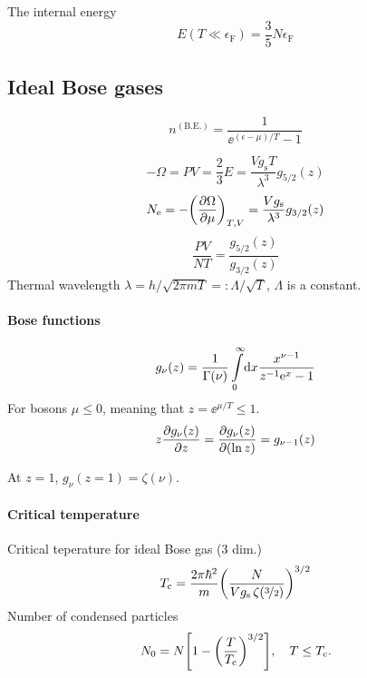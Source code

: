 \documentclass[11pt,letter, swedish, english, twocolumn
]{article}
\newcommand{\gs}{\ensuremath{{g_{\text{s}}}}}
\newcommand{\Ne}{\ensuremath{{N_{\text{e}}}}}
\newcommand{\Tc}{\ensuremath{{T_{\text{c}}}}}
\newcommand{\eF}{\ensuremath{{\epsilon_{\text{F}}}}}
\begin{document}
The internal energy
\begin{equation}
E(T\ll\eF)=\frac{3}{5}N\eF
\end{equation}


\subsection{Ideal Bose gases}
\begin{equation}
n^{(\text{B.E.})}=\frac{1}{\ee^{(\epsilon-\mu)/T}-1}
\end{equation}

\begin{equation}
-\Omega=PV=\frac{2}{3}E=\frac{V\gs T}{\lambda^3}g_{5/2}(z)
\end{equation}
\begin{equation}
\Ne=-\qty(\pdv{\Omega}{\mu})_{T,V}=\frac{V\gs}{\lambda^3}g_{3/2}(z)
\end{equation}
\begin{equation}
\frac{PV}{NT}=\frac{g_{5/2}(z)}{g_{3/2}(z)}
\end{equation}
Thermal wavelength $\lambda=h/\sqrt{2\pi mT}=:\Lambda/\sqrt{T}$, $\Lambda$ is a constant.

\paragraph{Bose functions}
\begin{equation}
g_\nu(z)=\frac{1}{\Gamma(\nu)}\int_0^\infty \!\rd{x}
\frac{x^{\nu-1}}{z^{-1}\ee^x - 1}
\end{equation}
For bosons $\mu\le0$, meaning that $z=\ee^{\mu/T}\le1$. 
\begin{equation}
z\pdv{g_\nu(z)}{z} = \pdv{g_\nu(z)}{(\ln z)}=g_{\nu-1}(z)
\end{equation}

At $z=1$, $g_\nu(z=1)=\zeta(\nu)$.

\paragraph{Critical temperature}
Critical teperature for ideal Bose gas (3 dim.)
\begin{equation}
\Tc=\frac{2\pi\hbar^2}{m}\qty(\frac{N}{V\gs\,\zeta(\nicefrac{3}{2})})^{3/2}
\end{equation}
Number of condensed particles
\begin{equation}
N_0=N\qty[1-\qty(\frac{T}{\Tc})^{3/2}]\qcomma
T\le\Tc.
\end{equation}
\end{document}

